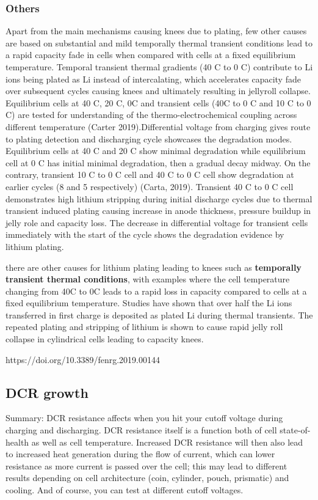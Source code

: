 \documentclass{article}
\begin{document}
\subsubsection{Others}
Apart from the main mechanisms causing knees due to plating, few other causes are based on substantial and mild temporally thermal transient conditions lead to a rapid capacity fade in cells when compared with cells at a fixed equilibrium temperature. Temporal transient thermal gradients (40 \degree C to 0 \degree C) contribute to Li ions being plated as Li instead of intercalating, which accelerates capacity fade over subsequent cycles causing knees and ultimately resulting in jellyroll collapse. Equilibrium cells at 40 \degree C, 20 \degree C, 0\degree C and transient cells (40\degree C to 0 \degree C and 10 \degree C to 0 \degree C) are tested for understanding of the thermo-electrochemical coupling across different temperature (Carter 2019).Differential voltage from charging gives route to plating detection and discharging cycle showcases the degradation modes. Equilibrium cells at 40 \degree C and 20 \degree C show minimal degradation while equilibrium cell at 0 \degree C has initial minimal degradation, then a gradual decay midway. On the contrary, transient 10 \degree C to 0 \degree C cell and 40 \degree C to 0 \degree C cell show degradation at earlier cycles (8 and 5 respectively) (Carta, 2019). Transient 40 \degree C to 0 \degree C cell demonstrates high lithium stripping during initial discharge cycles due to thermal transient induced plating causing increase in anode thickness, pressure buildup in jelly role and capacity loss. The decrease in differential voltage for transient cells immediately with the start of the cycle shows the degradation evidence by lithium plating.  

there are other causes for lithium plating leading to knees such as \textbf{temporally transient thermal conditions}, with examples where the cell temperature changing from 40\degree C to 0\degree C %
leads to a rapid loss in capacity compared to cells at a fixed equilibrium temperature. Studies have shown that over half the Li ions transferred in first charge is deposited as plated Li during thermal transients. The repeated plating and stripping of lithium is shown to cause rapid jelly roll collapse in cylindrical cells leading to capacity knees.

https://doi.org/10.3389/fenrg.2019.00144


\subsection{DCR growth}
Summary: DCR resistance affects when you hit your cutoff voltage during charging and discharging. DCR resistance itself is a function both of cell state-of-health as well as cell temperature. Increased DCR resistance will then also lead to increased heat generation during the flow of current, which can lower resistance as more current is passed over the cell; this may lead to different results depending on cell architecture (coin, cylinder, pouch, prismatic) and cooling. And of course, you can test at different cutoff voltages.
\end{document}

